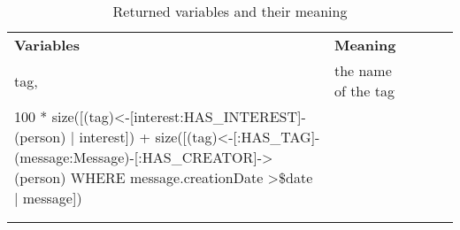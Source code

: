 \begin{table}[!ht]
\begin{tabular}{lllll}
\cline{1-2}
\multicolumn{1}{|l|}{\textbf{Variables}}                                                                                                                                                                                                                                       & \multicolumn{1}{l|}{\textbf{Meaning}}    &  &  &  \\ \cline{1-2}
\multicolumn{1}{|l|}{tag,}                                                                                                                                                                                                                                                     & \multicolumn{1}{l|}{the name of the tag} &  &  &  \\ \cline{1-2}
\multicolumn{1}{|l|}{100 * size({[}(tag)\textless{}-{[}interest:HAS\_INTEREST{]}-(person) | interest{]}) + size({[}(tag)\textless{}-{[}:HAS\_TAG{]}-(message:Message)-{[}:HAS\_CREATOR{]}-\textgreater{}(person) WHERE message.creationDate \textgreater \$date | message{]})} & \multicolumn{1}{l|}{}                    &  &  &  \\ \cline{1-2}
                                                                                                                                                                                                                                                                               &                                          &  &  &  \\
                                                                                                                                                                                                                                                                               &                                          &  &  & 
\end{tabular}
\caption{Returned variables and their meaning}
\label{RetCypher8BITable}
\end{table}